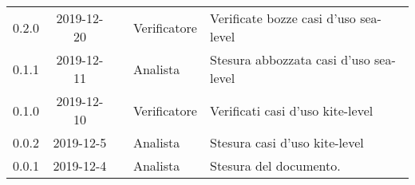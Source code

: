 {\begin{longtable}{ c c  C{4cm}  C{3cm} C{4cm}}
0.2.0 & 2019-12-20 & \SE{} & Verificatore & Verificate bozze casi d'uso sea-level\\

0.1.1 & 2019-12-11 & \DF{} & Analista & Stesura abbozzata casi d'uso sea-level\\

0.1.0 & 2019-12-10 & \BR{} & Verificatore & Verificati casi d'uso kite-level\\

0.0.2 & 2019-12-5 & \CE{} & Analista & Stesura casi d'uso kite-level\\

0.0.1 & 2019-12-4 & \CE{} & Analista & Stesura del documento.  \\		
		
\end{longtable}
}